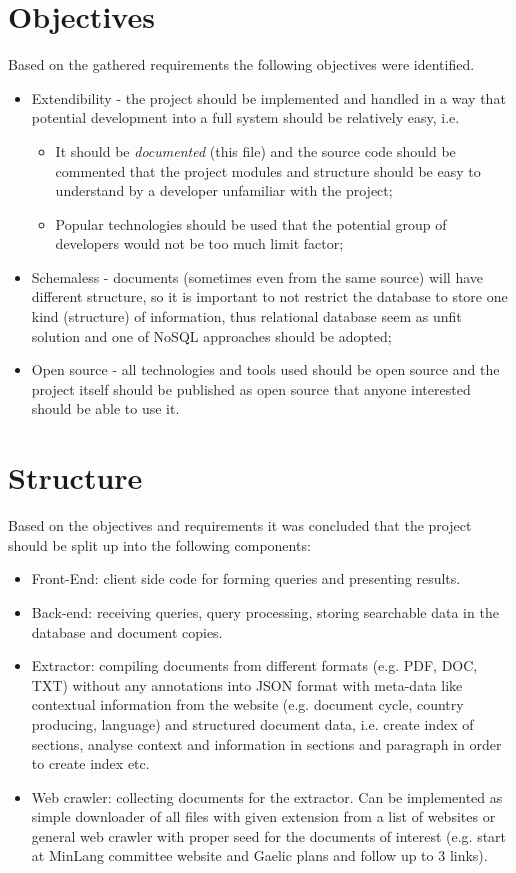 \documentclass{tufte-book}
\begin{document}
\section{Objectives}
Based on the gathered requirements the following objectives were identified.
\begin{itemize}
  \item Extendibility - the project should be implemented and handled in a way that potential development into a full system should be relatively easy, i.e.
    \begin{itemize}
      \item It should be \emph{documented} (this file) and the source code should be commented that the project modules and structure should be easy to understand by a developer unfamiliar with the project;
      \item Popular technologies should be used that the potential group of developers would not be too much limit factor;
    \end{itemize}
  \item Schemaless - documents (sometimes even from the same source) will have different structure, so it is important to not restrict the database to store one kind (structure) of information, thus relational database seem as unfit solution and one of NoSQL approaches should be adopted;
  \item Open source - all technologies and tools used should be open source and the project itself should be published as open source that anyone interested should be able to use it.
\end{itemize}

\section{Structure}
Based on the objectives and requirements it was concluded that the project should be split up into the following components:
\begin{itemize}
  \item Front-End: client side code for forming queries and presenting results.
  \item Back-end: receiving queries, query processing, storing searchable data in the database and document copies.
  \item Extractor: compiling documents from different formats (e.g. PDF, DOC, TXT) without any annotations into JSON format with meta-data like contextual information from the website (e.g. document cycle, country producing, language) and structured document data, i.e. create index of sections, analyse context and information in sections and paragraph in order to create index etc.
  \item Web crawler: collecting documents for the extractor. Can be implemented as simple downloader of all files with given extension from a list of websites or general web crawler with proper seed for the documents of interest (e.g. start at MinLang committee website and Gaelic plans and follow up to 3 links).
\end{itemize}
\end{document}
